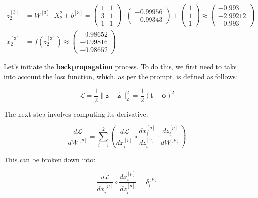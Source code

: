 \documentclass[12pt]{article}
\begin{document}
\begin{enumerate}[leftmargin=\labelsep]
\begin{align*}
                  z^{[3]}_2 &= {W}^{[3]} \cdot {X}^{2}_2 + {b}^{[3]} = \begin{pmatrix} 1 & 1 \\ 3 & 1 \\ 1 & 1\end{pmatrix} \cdot  \begin{pmatrix} -0.99956 \\ -0.99343\end{pmatrix} +
                \begin{pmatrix} 1 \\ 1 \\ 1\end{pmatrix} \approx \begin{pmatrix} -0.993 \\ -2.99212 \\ -0.993\end{pmatrix} \\
                {x}^{[3]}_2 &= f\left({z}^{[3]}_2\right) \approx \begin{pmatrix} -0.98652 \\ -0.99816 \\ -0.98652\end{pmatrix}
            \end{align*}
            \endgroup

          Let's initiate the \textbf{backpropagation} process. To do this, we first need to take into account the loss function, which, as per the prompt, is defined as follows:

          \begin{equation}\label{ex2-loss}
            \mathcal{L} = \frac{1}{2} \|\mathbf{z} - \hat{\mathbf{z}}\|^{2}_{2} = \frac{1}{2} \left(\mathbf{t} - {\mathbf{o}}\right)^{2}
          \end{equation}

          The next step involves computing its derivative:

          \begin{equation}
            \frac{d\mathcal{L}}{dW^{[p]}} = \sum_{i=1}^{2} \left(\frac{d\mathcal{L}}{dx^{[p]}_i} \circ \frac{dx^{[p]}_i}{dz^{[p]}_i} \cdot \frac{dz^{[p]}_i}{dW^{[p]}} \right)
          \end{equation}

          This can be broken down into:

          \vskip -0.3cm
          \begin{equation*}
            \frac{d\mathcal{L}}{dx^{[p]}_i} \circ \frac{dx^{[p]}_i}{dz^{[p]}_i} = \delta^{[p]}_i
          \end{equation*}


\end{enumerate}
\end{document}

